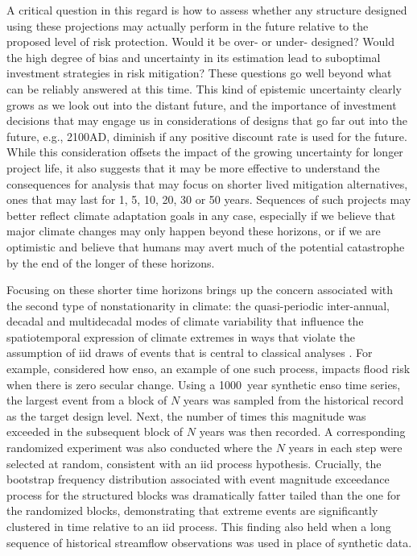 \documentclass[12pt]{article}
\begin{document}
A critical question in this regard is how to assess whether any structure designed using these projections may actually perform in the future relative to the proposed level of risk protection.
Would it be over- or under- designed?
Would the high degree of bias and uncertainty in its estimation lead to suboptimal investment strategies in risk mitigation?
These questions go well beyond what can be reliably answered at this time.
This kind of epistemic uncertainty clearly grows as we look out into the distant future, and the importance of investment decisions that may engage us in considerations of designs that go far out into the future, e.g., 2100AD, diminish if any positive discount rate is used for the future.
While this consideration offsets the impact of the growing uncertainty for longer project life, it also suggests that it may be more effective to understand the consequences for analysis that may focus on shorter lived mitigation alternatives, ones that may last for 1, 5, 10, 20,  30 or 50 years.
Sequences of such projects may better reflect climate adaptation goals in any case, especially if we believe that major climate changes may only happen beyond these horizons, or if we are optimistic and believe that humans may avert much of the potential catastrophe by the end of the longer of these horizons.

Focusing on these shorter time horizons brings up the concern associated with the second type of nonstationarity in climate: the quasi-periodic inter-annual, decadal and multidecadal modes of climate variability \citep[see][for a review]{Hannachi2017} that influence the spatiotemporal expression of climate extremes in ways that violate the assumption of \gls{iid} draws of events that is central to classical analyses \citep{Matalas2012}.
For example, \citet{Jain2001} considered how \gls{enso}, an example of one such process, impacts flood risk when there is zero secular change.
Using a \SI{1000}{year} synthetic \gls{enso} time series, the largest event from a block of $N$ years was sampled from the historical record as the target design level.
Next, the number of times this magnitude was exceeded in the subsequent block of $N$ years was then recorded.
A corresponding randomized experiment was also conducted where the $N$ years in each step were selected at random, consistent with an \gls{iid} process hypothesis.
Crucially, the bootstrap frequency distribution associated with event magnitude exceedance process for the structured blocks was dramatically fatter tailed than the one for the randomized blocks, demonstrating that extreme events are significantly clustered in time relative to an \gls{iid} process.
This finding also held when a long sequence of historical streamflow observations was used in place of synthetic data.
\end{document}

